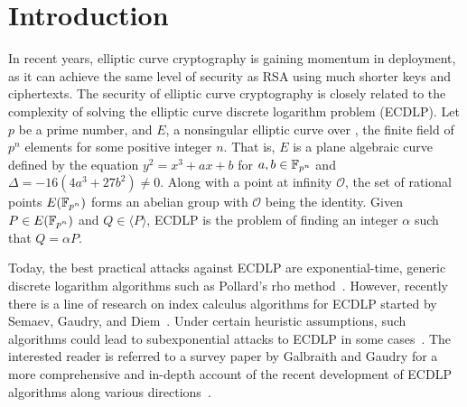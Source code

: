 %
%

\section{Introduction}
%
In recent years, elliptic curve cryptography is gaining momentum in
deployment, as it can achieve the same level of security as RSA using
much shorter keys and ciphertexts.
%
The security of elliptic curve cryptography is closely related to the
complexity of solving the elliptic curve discrete logarithm problem
(ECDLP).
%
Let $p$ be a prime number, and $E$, a nonsingular elliptic curve over
, the finite field of $p^n$ elements for some positive integer
$n$.
%
That is, $E$ is a plane algebraic curve defined by the equation
$y^2=x^3+ax+b$ for $a,b\in\mathbb F_{p^n}$ and $\Delta=-16(4a^3+27b^2)\neq 0$.
%
Along with a point at infinity $\mathcal O$, the set of rational
points $E(\mathbb F_{p^n})$ forms an abelian group with $\mathcal O$ being the
identity.
%
Given $P\in E(\mathbb F_{p^n})$ and $Q\in\langle P\rangle$, ECDLP is the
problem of finding an integer $\alpha$ such that $Q=\alpha P$.

Today, the best practical attacks against ECDLP are exponential-time,
generic discrete logarithm algorithms such as Pollard's rho
method~\cite{1978-pollard-kangaroo}.
%
However, recently there is a line of research on index calculus
algorithms for ECDLP started by Semaev, Gaudry, and
Diem~\cite{DBLP:journals/iacr/Semaev04,DBLP:journals/jsc/Gaudry09,DBLP:journals/moc/Diem11}.
%
Under certain heuristic assumptions, such algorithms could lead to
subexponential attacks to ECDLP in some
cases~\cite{DBLP:conf/eurocrypt/FaugerePPR12,DBLP:journals/iacr/PetitQ12,DBLP:conf/iwsec/HuangPST13}.
%
The interested reader is referred to a survey paper by Galbraith and
Gaudry for a more comprehensive and in-depth account of the recent
development of ECDLP algorithms along various
directions~\cite{DBLP:journals/dcc/GalbraithG16}.

